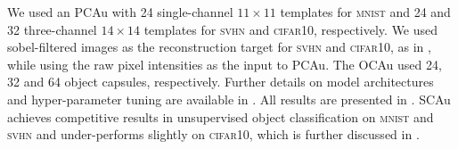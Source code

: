 We used an \gls{PCAu} with 24 single-channel $11\times11$ templates for \textsc{mnist} and 24 and 32 three-channel $14\times14$ templates for \textsc{svhn} and \textsc{cifar10}, respectively.
We used sobel-filtered images as the reconstruction target for \textsc{svhn} and \textsc{cifar10}, as in \cite{Jaiswal2018capsule}, while using the raw pixel intensities as the input to \gls{PCAu}.
The \gls{OCAu} used 24, 32 and 64 object capsules, respectively.
Further details on model architectures and hyper-parameter tuning are available in .
All results are presented in .
\gls{SCAu} achieves competitive results in unsupervised object classification on \textsc{mnist} and \textsc{svhn} and under-performs slightly on \textsc{cifar10}, which is further discussed in .

